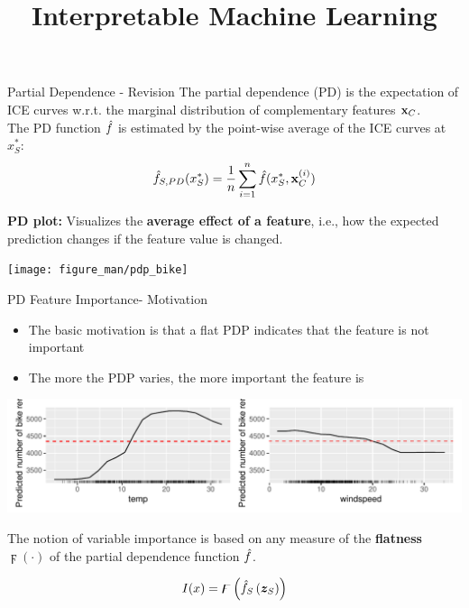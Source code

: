 \documentclass[11pt,compress,t,notes=noshow, aspectratio=169, xcolor=table]{beamer}
\title{Interpretable Machine Learning}
\date{}
\begin{document}
\newcommand{\titlefigure}{figure_man/pdps_bike}
\newcommand{\learninggoals}{
\item Introduction to PDP feature importance
\item Numerical and Categorical Measures of flatness
}


\begin{vbframe}{Partial Dependence - Revision}
The partial dependence (PD) is the expectation of ICE curves w.r.t. the marginal distribution of complementary features $\xv_C$.\\
The PD function $\fh$ is estimated by the point-wise average of the ICE curves at $x_S^*$:
$$\fh_{S, PD}(x_S^*) = \frac{1}{n} \sum_{i=1}^n \fh(x_S^*, \xv_C^{(i)})$$



\textbf{PD plot:} Visualizes the \textbf{average effect of a feature},
  i.e., how the expected prediction changes if the feature value is changed.
\begin{center}
\texttt{[image: figure\_man/pdp\_bike]}
\end{center}
\end{vbframe}

\begin{vbframe}{PD Feature Importance- Motivation}
\begin{itemize}
    \item The basic motivation is that a flat PDP indicates that the feature is not important
    \item The more the PDP varies, the more important the feature is
\end{itemize}

\begin{center}
\includegraphics[width=1\textwidth]{figure_man/pdps_bike}
\end{center}

The notion of variable importance is based on any measure of the \textbf{flatness} $\digamma(\cdot)$ of the partial dependence function $\fh$.

$$
I(x)=\digamma\left(\fh_{S}\left(\boldsymbol{z}_{S}\right)\right)
$$

\end{vbframe}
\end{document}
